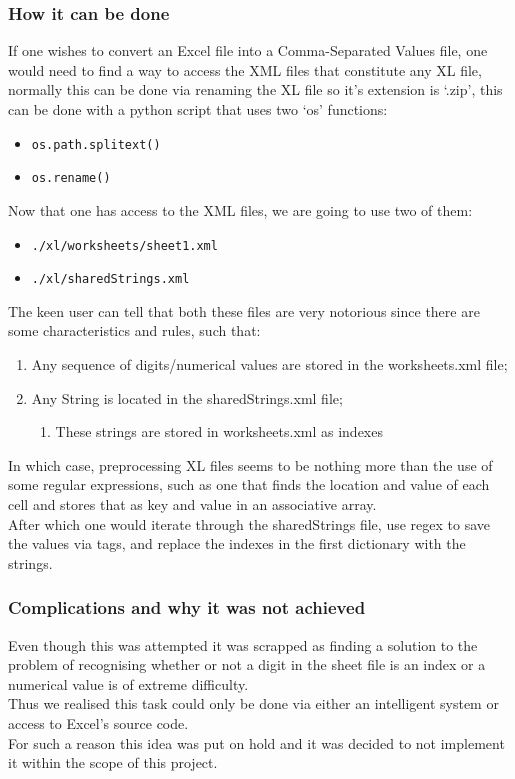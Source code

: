 \documentclass[11pt,a4paper,times]{report}
\def\CSV{Comma-Separated Values\xspace}
\begin{document}
\subsubsection*{How it can be done} If one wishes to convert an Excel file into a
\CSV file, one would need to find a way to access the XML files that constitute
any XL file, normally this can be done via renaming the XL file so it's extension
is `.zip', this can be done with a python script that uses two `os' functions:
\begin{itemize}
    \item \verb|os.path.splitext()|
    \item \verb|os.rename()|
\end{itemize}
Now that one has access to the XML files, we are going to use two of them:
\begin{itemize}
    \item \verb|./xl/worksheets/sheet1.xml|
    \item \verb|./xl/sharedStrings.xml|
\end{itemize}
The keen user can tell that both these files are very notorious since there
are some characteristics and rules, such that:
\begin{enumerate}
    \item Any sequence of digits/numerical values are stored in the worksheets.xml
        file;
    \item Any String is located in the sharedStrings.xml file;
    \begin{enumerate} \item These strings are stored in worksheets.xml as indexes \end{enumerate}
\end{enumerate}
In which case, preprocessing XL files seems to be nothing more than the use of
some regular expressions, such as one that finds the location and value of
each cell and stores that as key and value in an associative array.\\ After which
one would iterate through the sharedStrings file, use regex to save the values
via tags, and replace the indexes in the first dictionary with the strings.
\subsubsection*{Complications and why it was not achieved} \label{section:XLCOMP}
Even though this was attempted it was scrapped as finding a solution to
the problem of recognising whether or not a digit in the sheet file is an
index or a numerical value is of extreme difficulty.\\
Thus we realised this task could only be done via either an intelligent system or
access to Excel's source code. 
\\  For such a reason this idea was put on hold and it was decided to
not implement it within the scope of this project.
\end{document}
